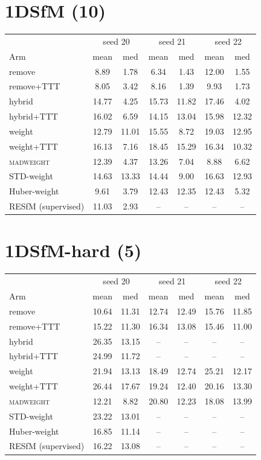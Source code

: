 \documentclass[10pt]{article}
\begin{document}
\section*{1DSfM (10)}
\begin{tabular}{lcccccc}
\toprule
 & \multicolumn{2}{c}{seed 20} & \multicolumn{2}{c}{seed 21} & \multicolumn{2}{c}{seed 22}\\
Arm & mean & med & mean & med & mean & med\\
\midrule
remove & 8.89 & 1.78 & 6.34 & 1.43 & 12.00 & 1.55\\
remove+TTT & 8.05 & 3.42 & 8.16 & 1.39 & 9.93 & 1.73\\
hybrid & 14.77 & 4.25 & 15.73 & 11.82 & 17.46 & 4.02\\
hybrid+TTT & 16.02 & 6.59 & 14.15 & 13.04 & 15.98 & 12.32\\
weight & 12.79 & 11.01 & 15.55 & 8.72 & 19.03 & 12.95\\
weight+TTT & 16.13 & 7.16 & 18.45 & 15.29 & 16.34 & 10.32\\
\textsc{madweight} & 12.39 & 4.37 & 13.26 & 7.04 & 8.88 & 6.62\\
STD-weight & 14.63 & 13.33 & 14.44 & 9.00 & 16.63 & 12.93\\
Huber-weight & 9.61 & 3.79 & 12.43 & 12.35 & 12.43 & 5.32\\
\midrule
RESfM (supervised) & 11.03 & 2.93 & -- & -- & -- & --\\
\bottomrule
\end{tabular}
\vspace{1em}

\section*{1DSfM-hard (5)}
\begin{tabular}{lcccccc}
\toprule
 & \multicolumn{2}{c}{seed 20} & \multicolumn{2}{c}{seed 21} & \multicolumn{2}{c}{seed 22}\\
Arm & mean & med & mean & med & mean & med\\
\midrule
remove & 10.64 & 11.31 & 12.74 & 12.49 & 15.76 & 11.85\\
remove+TTT & 15.22 & 11.30 & 16.34 & 13.08 & 15.46 & 11.00\\
hybrid & 26.35 & 13.15 & -- & -- & -- & --\\
hybrid+TTT & 24.99 & 11.72 & -- & -- & -- & --\\
weight & 21.94 & 13.13 & 18.49 & 12.74 & 25.21 & 12.17\\
weight+TTT & 26.44 & 17.67 & 19.24 & 12.40 & 20.16 & 13.30\\
\textsc{madweight} & 12.21 & 8.82 & 20.80 & 12.23 & 18.08 & 13.99\\
STD-weight & 23.22 & 13.01 & -- & -- & -- & --\\
Huber-weight & 16.85 & 11.14 & -- & -- & -- & --\\
\midrule
RESfM (supervised) & 16.22 & 13.08 & -- & -- & -- & --\\
\bottomrule
\end{tabular}
\vspace{1em}
\end{document}

